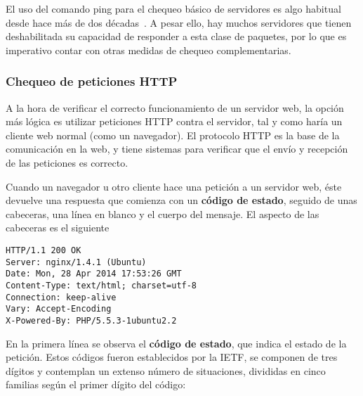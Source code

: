 El uso del comando ping para el chequeo básico de servidores es algo habitual
desde hace más de dos décadas~\cite{salus1994a}. A pesar ello, hay muchos
servidores que tienen deshabilitada su capacidad de responder a esta clase de
paquetes, por lo que es imperativo contar con otras medidas de chequeo
complementarias.

\subsubsection{Chequeo de peticiones HTTP}
\label{subsec:chequeoHttp}

A la hora de verificar el correcto funcionamiento de un servidor web, la opción
más lógica es utilizar peticiones \ac{HTTP} contra el servidor, tal y como haría
un cliente web normal (como un navegador). El protocolo HTTP es la base de la
comunicación en la web, y tiene sistemas para verificar que el envío y recepción
de las peticiones es correcto.

Cuando un navegador u otro cliente hace una petición a un servidor web, éste
devuelve una respuesta que comienza con un \textbf{código de
  estado}, seguido de unas cabeceras, una línea en blanco y el cuerpo del
mensaje. El aspecto de las cabeceras es el siguiente

\begin{verbatim}
HTTP/1.1 200 OK
Server: nginx/1.4.1 (Ubuntu)
Date: Mon, 28 Apr 2014 17:53:26 GMT
Content-Type: text/html; charset=utf-8
Connection: keep-alive
Vary: Accept-Encoding
X-Powered-By: PHP/5.5.3-1ubuntu2.2
\end{verbatim}

En la primera línea se observa el \textbf{código de estado}, que indica el
estado de la petición. Estos códigos fueron establecidos por la \ac{IETF}, se
componen de tres dígitos y contemplan un extenso número de situaciones,
divididas en cinco familias según el primer dígito del código:

